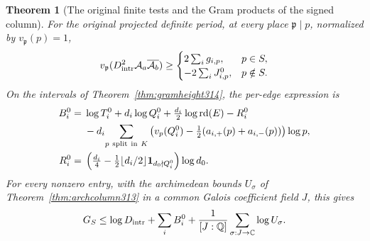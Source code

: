 \documentclass[a4paper,11pt]{article}
\newtheorem{theorem}[proposition]{Theorem}
\theoremstyle{definition}
\theoremstyle{remark}
\numberwithin{equation}{section}
\begin{document}
\begin{theorem}[The original finite tests and the Gram products of the signed column]\leavevmode
\label{thm:originalgram315}
For the original projected definite period, at every place
\(\mathfrak p\mid p\), normalized by \(v_{\mathfrak p}(p)=1\),
\[
 v_{\mathfrak p}(D_{\rm intr}^2\mathcal A_a
                              \overline{\mathcal A_b})\ge
 \begin{cases}
    2\sum_i g_{i,p},&p\in S,\\
    -2\sum_i J^0_{i,p},&p\notin S .
 \end{cases}
\]
On the intervals of Theorem~\ref{thm:gramheight314}, the
per-edge expression is
\[
 \begin{aligned}
 B_i^0={}&\log T_i^0+d_i\log Q_i^0
      +\tfrac{d_i}2\log\operatorname{rd}(E)-R_i^0\\
 &-d_i\!\sum_{p\ {\rm split\ in}\ K}
  \left(v_p(Q_i^0)-\tfrac12(a_{i,+}(p)+a_{i,-}(p))\right)\log p,\\
 R_i^0={}&\left(\tfrac{d_i}4-
   \tfrac12\lfloor d_i/2\rfloor{\bf1}_{d_0\nmid Q_i^0}\right)\log d_0 .
 \end{aligned}
\]
For every nonzero entry, with the archimedean bounds
\(U_\sigma\) of Theorem~\ref{thm:archcolumn313} in a common
Galois coefficient field \(J\), this gives
\[
 G_S\le \log D_{\rm intr}+\sum_i B_i^0+
                    \frac1{[J:\mathbb Q]}\sum_{\sigma:J\to\mathbb C}\log U_\sigma .
\]
\end{theorem}
\end{document}
